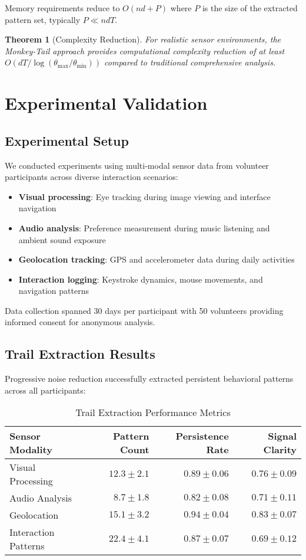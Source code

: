 \documentclass[12pt,a4paper]{article}
\newtheorem{theorem}{Theorem}
\begin{document}
Memory requirements reduce to $O(nd + P)$ where $P$ is the size of the extracted pattern set, typically $P \ll ndT$.

\begin{theorem}[Complexity Reduction]
For realistic sensor environments, the Monkey-Tail approach provides computational complexity reduction of at least $O(dT/\log(\theta_{\text{max}}/\theta_{\text{min}}))$ compared to traditional comprehensive analysis.
\end{theorem}

\section{Experimental Validation}

\subsection{Experimental Setup}

We conducted experiments using multi-modal sensor data from volunteer participants across diverse interaction scenarios:

\begin{itemize}
\item \textbf{Visual processing}: Eye tracking during image viewing and interface navigation
\item \textbf{Audio analysis}: Preference measurement during music listening and ambient sound exposure
\item \textbf{Geolocation tracking}: GPS and accelerometer data during daily activities
\item \textbf{Interaction logging}: Keystroke dynamics, mouse movements, and navigation patterns
\end{itemize}

Data collection spanned 30 days per participant with 50 volunteers providing informed consent for anonymous analysis.

\subsection{Trail Extraction Results}

Progressive noise reduction successfully extracted persistent behavioral patterns across all participants:

\begin{table}[H]
\centering
\caption{Trail Extraction Performance Metrics}
\begin{tabular}{@{}lrrr@{}}
\toprule
Sensor Modality & Pattern Count & Persistence Rate & Signal Clarity \\
\midrule
Visual Processing & $12.3 \pm 2.1$ & $0.89 \pm 0.06$ & $0.76 \pm 0.09$ \\
Audio Analysis & $8.7 \pm 1.8$ & $0.82 \pm 0.08$ & $0.71 \pm 0.11$ \\
Geolocation & $15.1 \pm 3.2$ & $0.94 \pm 0.04$ & $0.83 \pm 0.07$ \\
Interaction Patterns & $22.4 \pm 4.1$ & $0.87 \pm 0.07$ & $0.69 \pm 0.12$ \\
\bottomrule
\end{tabular}
\end{table}
\end{document}
